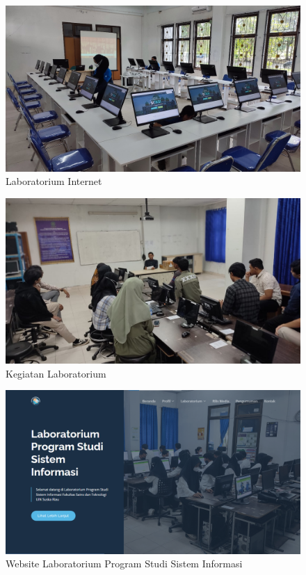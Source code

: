 \begin{figure}
	\centering
	\includegraphics[width=0.82\linewidth]{konten/gambar/lab-se.jpg}
	\caption{Laboratorium Internet}
	\label{fig:lab-int}
\end{figure}

\begin{figure}
	\centering
	\includegraphics[width=0.82\linewidth]{konten/gambar/kegiatan.jpg}
	\caption{Kegiatan Laboratorium}
	\label{fig:lab-sea}
\end{figure}

\begin{figure}
	\centering
	\includegraphics[width=0.82\linewidth]{konten//gambar/labsi.png}
	\caption{Website Laboratorium Program Studi Sistem Informasi}
	\label{fig:enter-label}
\end{figure}

